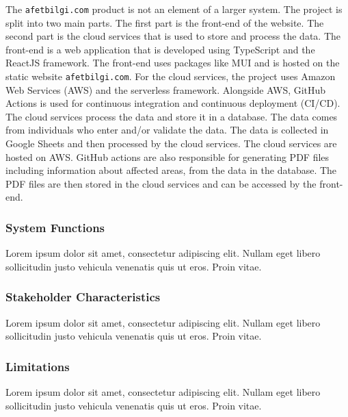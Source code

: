 \documentclass[a4paper]{article}
\begin{document}
                The \verb*|afetbilgi.com| product is not an element of a larger system. The project is split into two main parts.
                The first part is the front-end of the website. The second part is the cloud services that is used to store and
                process the data. The front-end is a web application that is developed using TypeScript and the ReactJS framework.
                The front-end uses packages like MUI and is hosted on the static website \verb*|afetbilgi.com|. 
                For the cloud services, the project uses Amazon Web Services (AWS) and the serverless framework. Alongside AWS,
                GitHub Actions is used for continuous integration and continuous deployment (CI/CD). The cloud services process 
                the data and store it in a database. The data comes from individuals who enter and/or validate the data. The data
                is collected in Google Sheets and then processed by the cloud services. The cloud services are hosted on AWS.
                GitHub actions are also responsible for generating PDF files including information about affected areas, from the
                data in the database. The PDF files are then stored in the cloud services and can be accessed by the front-end.

                \subsubsection{System Functions}

                Lorem ipsum dolor sit amet, consectetur adipiscing elit. Nullam eget libero sollicitudin justo vehicula venenatis quis ut eros. Proin vitae.

                \subsubsection{Stakeholder Characteristics}

                Lorem ipsum dolor sit amet, consectetur adipiscing elit. Nullam eget libero sollicitudin justo vehicula venenatis quis ut eros. Proin vitae.

                \subsubsection{Limitations}

                Lorem ipsum dolor sit amet, consectetur adipiscing elit. Nullam eget libero sollicitudin justo vehicula venenatis quis ut eros. Proin vitae.
\end{document}
